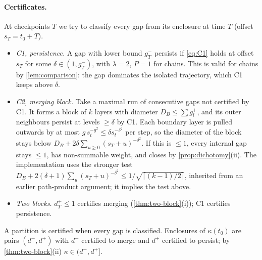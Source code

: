 \paragraph{Certificates.} At checkpoints $T$ we try to classify every gap from its enclosure at time $T$ (offset $s_T=t_0+T$).
\begin{itemize}[leftmargin=1.3em,itemsep=1pt]
\item \emph{C1, persistence.} A gap with lower bound $g^-_T$ persists if \eqref{eq:C1} holds at offset $s_T$ for some $\delta\in(1,g^-_T)$, with
$\lambda=2$, $P=1$ for chains. This is valid for chains by \cref{lem:comparison}: the gap dominates the isolated trajectory, which C1 keeps above
$\delta$.
\item \emph{C2, merging block.} Take a maximal run of consecutive gaps not certified by C1. It forms a block of $k$ layers with diameter
$D_B\le\sum g_l^+$, and its outer neighbours persist at levels $\ge\delta$ by C1. Each boundary layer is pulled outwards by at most
$g\,s_t^{-g^2}\le\delta s_t^{-\delta^2}$ per step, so the diameter of the block stays below $D_B+2\delta\sum_{u\ge0}(s_T+u)^{-\delta^2}$. If this is
$\le1$, every internal gap stays $\le1$, has non-summable weight, and closes by \cref{prop:dichotomy}(ii). The implementation uses the
stronger test $D_B+2(\delta+1)\sum_u(s_T+u)^{-\delta^2}\le1/\sqrt{\lceil(k-1)/2\rceil}$, inherited from an earlier path-product argument; it
implies the test above.
\item \emph{Two blocks.} $d_T^+\le1$ certifies merging (\cref{thm:two-block}(i)); C1 certifies persistence.
\end{itemize}
A partition is certified when every gap is classified. Enclosures of $\kappa(t_0)$ are pairs $(d^-,d^+)$ with $d^-$ certified to merge and $d^+$
certified to persist; by \cref{thm:two-block}(ii) $\kappa\in(d^-,d^+]$.

\begin{table}[h]
\centering\small

\caption{Validated enclosures of $\kappa(t_0)=\kappa(t_0;1,1)$, the explicit bounds of \cref{thm:two-block}(vi) and the leading-order
term of (v). The enclosures widen at large $t_0$ because certifying persistence just above $\kappa$ needs many steps.}
\label{tab:kappa}
\end{table}

\begin{table}[h]
\centering\small\setlength{\tabcolsep}{4pt}

\caption{Validated enclosures of $\kappa(t_0;\rho,\rho)$ for symmetric cut ratios (discrete map, at most $10^6$ steps). The increase with
$\rho$ is \cref{thm:two-block}(iv); the size of the shift is \cref{cor:topology}.}
\label{tab:rho}
\end{table}

